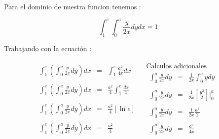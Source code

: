 \documentclass[12pt]{article}
\begin{document}
    \begin{flushleft}
        Para el dominio de nuestra funcion tenemos : 
    \end{flushleft}
    
    \begin{equation*}
        \displaystyle\int_{1}^{e}\int_{0}^{a}\frac{y}{2x}dydx = 1
    \end{equation*}
   
    \begin{flushleft}
        Trabajando con la ecuaci\'on :
    \end{flushleft}
    
    \begin{equation*}
        \begin{array}{c|c}
           \begin{array}{rcl}
                \displaystyle\int_{1}^{e}\left(\int_{0}^{a} \frac{y}{2x}dy\right)dx & = & \displaystyle \int_{1}^{e}\frac{a^2}{4x}dx
                \\
                \\
                \displaystyle\int_{1}^{e}\left(\int_{0}^{a} \frac{y}{2x}dy\right)dx & = & \displaystyle\frac{a^2}{4}\int_{1}^{e}\frac{dx}{x}
                \\
                \\
                \displaystyle\int_{1}^{e}\left(\int_{0}^{a} \frac{y}{2x}dy\right)dx & = & \displaystyle\frac{a^2}{4}[\ln e]
                \\
                \\
                \displaystyle\int_{1}^{e}\left(\int_{0}^{a} \frac{y}{2x}dy\right)dx & = & \displaystyle\frac{a^2}{4}
            \end{array}
            
            &
            
            \begin{array}{c}
                \mbox{Calculos adicionales}
                \\
                \begin{array}{rcl}
                    \displaystyle\int_{0}^{a}\frac{y}{2x}dy & = & \displaystyle\frac{1}{2x}\int_{0}^{a}y dy
                    \\
                    \\
                    \displaystyle\int_{0}^{a}\frac{y}{2x}dy & = & \displaystyle\frac{1}{2x}\left[\frac{y^2}{2}\right]\vert_{0}^{a}
                    \\
                    \\
                    \displaystyle\int_{0}^{a}\frac{y}{2x}dy & = & \displaystyle\frac{1}{2x} \frac{a^2}{2}
                    \\
                    \\
                    \displaystyle\int_{0}^{a}\frac{y}{2x}dy & = & \displaystyle\frac{a^2}{4x}
                \end{array}
            \end{array}
        \end{array}
    \end{equation*}
\end{document}
